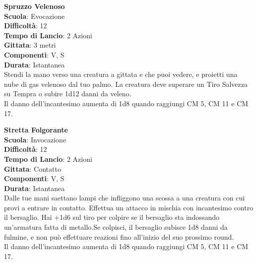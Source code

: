 \begin{multicols}{2}
\medskip\textbf{Spruzzo Velenoso}\\
\textbf{Scuola}: Evocazione\\
\textbf{Difficoltà}: 12\\
\textbf{Tempo di Lancio}: 2 Azioni\\
\textbf{Gittata}: 3 metri\\
\textbf{Componenti}: V, S\\
\textbf{Durata}: Istantanea\\
Stendi la mano verso una creatura a gittata e che puoi vedere, e proietti una nube di gas velenoso dal tuo palmo. La creatura deve superare un Tiro Salvezza su Tempra o subire 1d12 danni da veleno. \\
Il danno dell'incantesimo aumenta di 1d8 quando raggiungi CM 5, CM 11 e CM 17.

\medskip\textbf{Stretta Folgorante}\\
\textbf{Scuola}: Invocazione\\
\textbf{Difficoltà}: 12\\
\textbf{Tempo di Lancio}: 2 Azioni\\
\textbf{Gittata}: Contatto\\
\textbf{Componenti}: V, S\\
\textbf{Durata}: Istantanea\\
Dalle tue mani saettano lampi che infliggono una scossa a una creatura con cui provi a entrare in contatto. Effettua un attacco in mischia con incantesimo contro il bersaglio. Hai +1d6 sul tiro per colpire se il bersaglio sta indossando un'armatura fatta di metallo.Se colpisci, il bersaglio subisce 1d8 danni da fulmine, e non può effettuare reazioni fino all'inizio del suo prossimo round.\\
Il danno dell'incantesimo aumenta di 1d8 quando raggiungi CM 5, CM 11 e CM 17.


\end{multicols}

